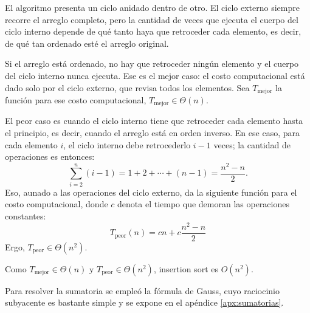 El algoritmo presenta un ciclo anidado dentro de otro. El ciclo externo siempre recorre el arreglo completo, pero la cantidad de veces que ejecuta el cuerpo del ciclo interno depende de qué tanto haya que retroceder cada elemento, es decir, de qué tan ordenado esté el arreglo original.

Si el arreglo está ordenado, no hay que retroceder ningún elemento y el cuerpo del ciclo interno nunca ejecuta. Ese es el mejor caso: el costo computacional está dado solo por el ciclo externo, que revisa todos los elementos. Sea \(T_\text{mejor}\) la función para ese costo computacional, \(T_\text{mejor} \in \Theta(n)\).

El peor caso es cuando el ciclo interno tiene que retroceder cada elemento hasta el principio, es decir, cuando el arreglo está en orden inverso. En ese caso, para cada elemento \(i\), el ciclo interno debe retrocederlo \(i-1\) veces; la cantidad de operaciones es entonces:
\[\sum_{i=2}^n (i-1) = 1+2+\cdots+(n-1) = \frac{n^2-n}{2}.\]
Eso, aunado a las operaciones del ciclo externo, da la siguiente función para el costo computacional, donde \(c\) denota el tiempo que demoran las operaciones constantes:
\[T_\text{peor}(n) = cn + c\frac{n^2-n}{2}\]
Ergo, \(T_\text{peor} \in \Theta(n^2)\). 

Como \(T_\text{mejor} \in \Theta(n)\) y \(T_\text{peor} \in \Theta(n^2)\), insertion sort es \(O(n^2)\).

\begin{tip}
Para resolver la sumatoria se empleó la fórmula de Gauss, cuyo raciocinio subyacente es bastante simple y se expone en el apéndice \ref{apx:sumatorias}.
\end{tip}

